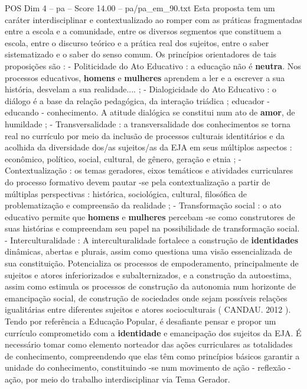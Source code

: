 \begin{textsample}{POS Dim 4 – pa – Score 14.00 – pa/pa\_em\_90.txt}  \label{ex:f4_pos_010}
Esta proposta tem um caráter interdisciplinar e contextualizado ao romper com as práticas fragmentadas entre a escola e a comunidade, entre os diversos segmentos que constituem a escola, entre o discurso teórico e a prática real dos sujeitos, entre o saber sistematizado e o saber do senso comum.
Os princípios orientadores de tais proposições são : - Politicidade do Ato Educativo : a educação não é \textbf{neutra}.
Nos processos educativos, \textbf{homens} e \textbf{mulheres} aprendem a ler e a escrever a sua história, desvelam a sua realidade.... ; - Dialogicidade do Ato Educativo : o diálogo é a base da relação pedagógica, da interação triádica ; educador - educando - conhecimento.
A atitude dialógica se constitui num ato de \textbf{amor}, de humildade ; - Transversalidade : a transversalidade dos conhecimentos se torna real no currículo por meio da inclusão de processos culturais identitários e da acolhida da diversidade dos/as sujeitos/as da EJA em seus múltiplos aspectos : econômico, político, social, cultural, de gênero, geração e etnia ; - Contextualização : os temas geradores, eixos temáticos e atividades curriculares do processo formativo devem pautar -se pela contextualização a partir de múltiplas perspectivas : histórica, sociológica, cultural, filosófica de problematização e compreensão da realidade ; - Transformação social : o ato educativo permite que \textbf{homens} e \textbf{mulheres} percebam -se como construtores de suas histórias e compreendam seu papel na possibilidade de transformação social. - Interculturalidade : A interculturalidade fortalece a construção de \textbf{identidades} dinâmicas, abertas e plurais, assim como questiona uma visão essencializada de sua constituição.
Potencializa os processos de empoderamento, principalmente de sujeitos e atores inferiorizados e subalternizados, e a construção da autoestima, assim como estimula os processos de construção da autonomia num horizonte de emancipação social, de construção de sociedades onde sejam possíveis relações igualitárias entre diferentes sujeitos e atores socioculturais ( CANDAU. 2012 ).
Tendo por referência a Educação Popular, é desafiante pensar e propor um currículo comprometido com a \textbf{identidade} e emancipação dos sujeitos da EJA.
É necessário tomar como elemento norteador das ações curriculares as totalidades de conhecimento, compreendendo que elas têm como princípios básicos garantir a unidade do conhecimento, constituindo -se num movimento de ação - reflexão - ação, por meio do trabalho interdisciplinar via Tema Gerador.

\end{textsample}
